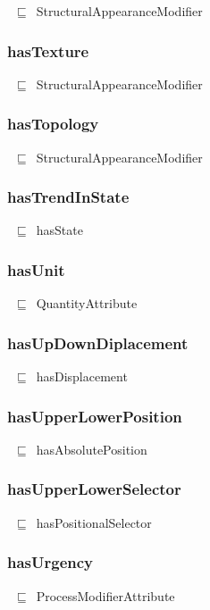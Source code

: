 \documentclass{article}
\begin{document}
~\ensuremath{\sqsubseteq}~StructuralAppearanceModifier

\subsubsection*{hasTexture}

~\ensuremath{\sqsubseteq}~StructuralAppearanceModifier

\subsubsection*{hasTopology}

~\ensuremath{\sqsubseteq}~StructuralAppearanceModifier

\subsubsection*{hasTrendInState}

~\ensuremath{\sqsubseteq}~hasState

\subsubsection*{hasUnit}

~\ensuremath{\sqsubseteq}~QuantityAttribute

\subsubsection*{hasUpDownDiplacement}

~\ensuremath{\sqsubseteq}~hasDisplacement

\subsubsection*{hasUpperLowerPosition}

~\ensuremath{\sqsubseteq}~hasAbsolutePosition

\subsubsection*{hasUpperLowerSelector}

~\ensuremath{\sqsubseteq}~hasPositionalSelector

\subsubsection*{hasUrgency}

~\ensuremath{\sqsubseteq}~ProcessModifierAttribute
\end{document}
